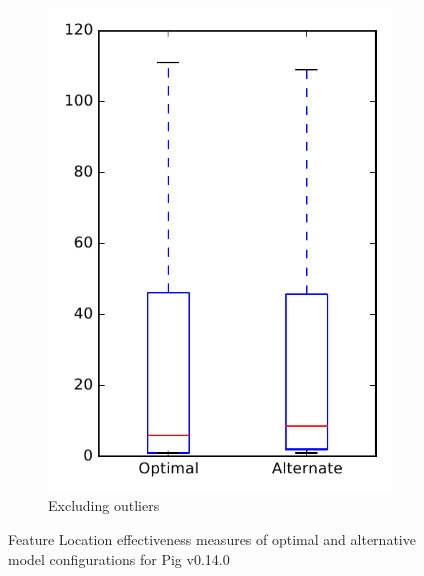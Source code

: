 \begin{figure}
\begin{subfigure}{.4\textwidth}
        \includegraphics[height=0.4\textheight]{figures/combo/flt_rq1_pig_no_outlier}
        \caption{Excluding outliers}\label{fig:combo:flt:rq1:pig_no_outlier}
    \end{subfigure}
\caption{Feature Location effectiveness measures of optimal and alternative model configurations for Pig v0.14.0}
\label{fig:combo:flt:rq1:pig}
\end{figure}

